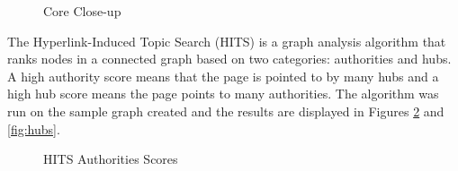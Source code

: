 \begin{figure}[h!]
\centering
{}
\caption{Core Close-up}
\label{fig:coreclose}
\end{figure}

\clearpage

The Hyperlink-Induced Topic Search (HITS) is a graph analysis algorithm that ranks nodes in a connected graph based on two categories: authorities and hubs. A high authority score means that the page is pointed to by many hubs and a high hub score means the page points to many authorities. The algorithm was run on the sample graph created and the results are displayed in Figures \ref{fig:authorities} and \ref{fig:hubs}.

\begin{figure}[h!]
\centering
{}
\caption{HITS Authorities Scores}
\label{fig:authorities}
\end{figure}

